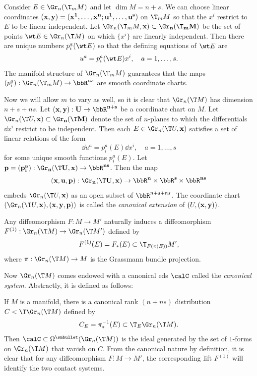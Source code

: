 Consider $E\in\Gr_n(\T_m M)$ and let $\dim M=n+s$. We can choose linear coordinates $(\bf{x},\bf{y})=(x^1,\ldots,x^n;u^1,\ldots,u^s)$ on $\T_m M$ so that the $x^i$ restrict to $E$ to be linear independent. Let $\Gr_n(\T_m M,\bf{x})\subset \Gr_n(\T_m M)$ be the set of points $\wt E\in\Gr_n(\T M)$ on which $\{x^i\}$ are linearly independent. Then there are unique numbers $p_i^a(\wt E)$ so that the defining equations of $\wt E$ are 
\[u^a=p^a_i(\wt E)x^i,\quad a=1,\ldots,s.\label{eq 18014}\]
The manifold structure of $\Gr_n(\T_m M)$  guarantees that the maps $(p^a_i):\Gr_n(\T_m M)\to \bbR^{ns}$ are smooth coordinate charts. 

Now we will allow $m$ to vary as well, so it is clear that $\Gr_n(\T M)$ has dimension $n+s+ns$. Let $(\bf{x},\bf{y}):U\to \bbR^{n+s}$ be a coordinate chart on $M$. Let $\Gr_n(\T U,\bf{x})\subset \Gr_n(\T M)$ denote the set of $n$-planes to which the differentials $\dd x^i$ restrict to be independent. Then each $E\in\Gr_n(\T U,\bf{x})$ satisfies a set of linear relations of the form 
\[\dd u^a=p^a_i(E)\dd x^i,\quad a=1,\ldots,s\]
for some unique smooth functions $p_i^a(E)$. Let $\bf{p}=(p^a_i):\Gr_n(\T U,\bf{x})\to \bbR^{ns}$. Then the map 
\[(\bf{x},\bf{u},\bf{p}):\Gr_n(\T U,\bf{x})\to \bbR^n\times\bbR^s\times\bbR^{ns}\]
embeds $\Gr_n(\T U,\bf{x})$ as an open subset of $\bbR^{n+s+ns}$. The coordinate chart $(\Gr_n(\T U,\bf{x}),(\bf{x},\bf{y},\bf{p}))$ is called the \emph{canonical extension} of $(U,(\bf{x},\bf{y}))$.

Any diffeomorphism $F:M\to M'$ naturally induces a diffeomorphism $F^{(1)}:\Gr_n(\T M)\to \Gr_n(\T M')$ defined by 
\[F^{(1)}(E)=F_\ast(E)\subset \T_{F(\pi(E))}M',\]
where $\pi:\Gr_n(\T M)\to M$ is the Grassmann bundle projection. 

Now $\Gr_n(\T M)$ comes endowed with a canonical \gls{eds} $\calC$ called the \emph{canonical system}. Abstractly, it is defined as follows: 

\begin{defn}
    If $M$ is a manifold, there is a canonical rank $(n+ns)$ distribution $C< \T \Gr_n(\T M)$ defined by 
    \[C_E=\pi_\ast^{-1}(E)\subset \T_E\Gr_n(\T M).\]
    Then $\calC\subset\Omega^{\smbullet}(\Gr_n(\T M))$ is the ideal generated by the set of $1$-forms on $\Gr_n(\T M)$ that vanish on $C$. From the canonical nature by definition, it is clear that for any diffeomorphism $F:M\to M'$, the corresponding lift $F^{(1)}$ will identify the two contact systems.
\end{defn}

